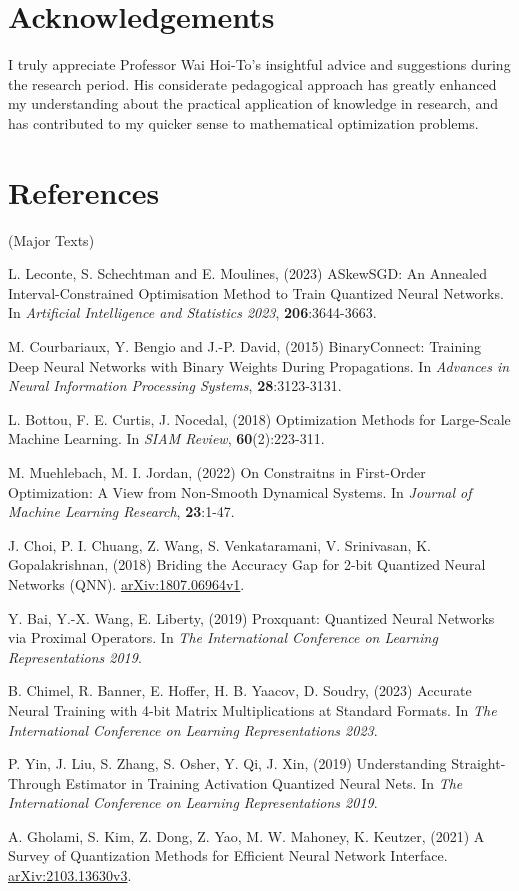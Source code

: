 \documentclass[10pt,a4paper]{article}
\begin{document}
\section{Acknowledgements}

I truly appreciate Professor Wai Hoi-To's insightful advice and suggestions during the research period. His considerate pedagogical approach has greatly enhanced my understanding about the practical application of knowledge in research, and has contributed to my quicker sense to mathematical optimization problems.

\newpage
\section{References}

 (Major Texts)
\begin{enumerate}[label=\text{[}A\arabic*\text{]}]
     \item \label{A1}L. Leconte, S. Schechtman and E. Moulines, (2023) ASkewSGD: An Annealed Interval-Constrained Optimisation Method to Train Quantized Neural Networks. In \textit{Artificial Intelligence and Statistics 2023}, \textbf{206}:3644-3663.
     \item \label{A2}M. Courbariaux, Y. Bengio and J.-P. David, (2015) BinaryConnect: Training Deep Neural Networks with Binary Weights During Propagations. In \textit{Advances in Neural Information Processing Systems}, \textbf{28}:3123-3131.
     \item \label{A3}L. Bottou, F. E. Curtis, J. Nocedal, (2018) Optimization Methods for Large-Scale Machine Learning. In \textit{SIAM Review}, \textbf{60}(2):223-311.
     \item \label{A4}M. Muehlebach, M. I. Jordan, (2022) On Constraitns in First-Order Optimization: A View from Non-Smooth Dynamical Systems. In \textit{Journal of Machine Learning Research}, \textbf{23}:1-47.
     \item \label{A5}J. Choi, P. I. Chuang, Z. Wang, S. Venkataramani, V. Srinivasan, K. Gopalakrishnan, (2018) Briding the Accuracy Gap for 2-bit Quantized Neural Networks (QNN). \url{arXiv:1807.06964v1}.
     \item \label{A6}Y. Bai, Y.-X. Wang, E. Liberty, (2019) Proxquant: Quantized Neural Networks via Proximal Operators. In \textit{The International Conference on Learning Representations 2019}.
     \item \label{A7}B. Chimel, R. Banner, E. Hoffer, H. B. Yaacov, D. Soudry, (2023) Accurate Neural Training with 4-bit Matrix Multiplications at Standard Formats. In \textit{The International Conference on Learning Representations 2023}.
     \item \label{A8}P. Yin, J. Liu, S. Zhang, S. Osher, Y. Qi, J. Xin, (2019) Understanding Straight-Through Estimator in Training Activation Quantized Neural Nets. In \textit{The International Conference on Learning Representations 2019}.
     \item \label{A9}A. Gholami, S. Kim, Z. Dong, Z. Yao, M. W. Mahoney, K. Keutzer, (2021) A Survey of Quantization Methods for Efficient Neural Network Interface. \url{arXiv:2103.13630v3}.

\end{enumerate}
\end{document}
